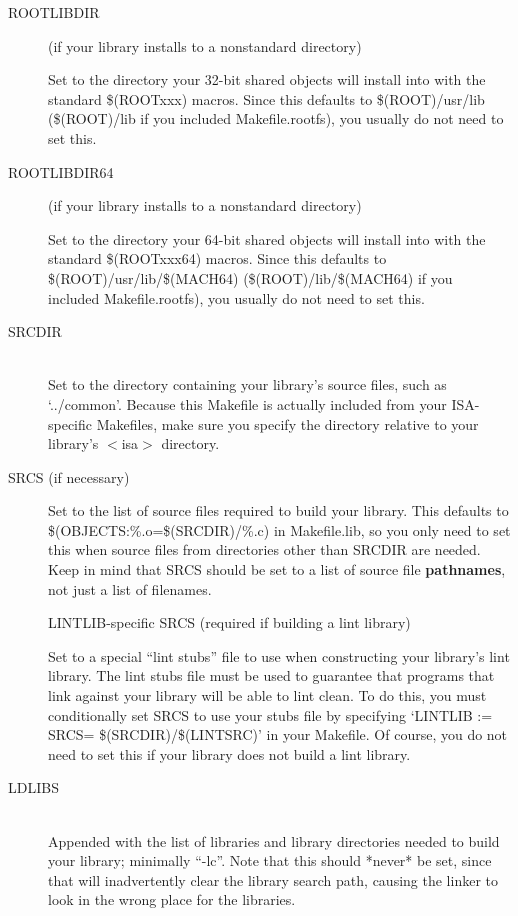 \documentclass{article}
\begin{document}
\begin{description}
\item[ROOTLIBDIR] (if your library installs to a nonstandard directory)

  Set to the directory your 32-bit shared objects will install into with the
  standard \$(ROOTxxx) macros. Since this defaults to \$(ROOT)/usr/lib
  (\$(ROOT)/lib if you included Makefile.rootfs), you usually do not need to set
  this.

\item[ROOTLIBDIR64] (if your library installs to a nonstandard directory)

  Set to the directory your 64-bit shared objects will install into with the
  standard \$(ROOTxxx64) macros. Since this defaults to \\
  \$(ROOT)/usr/lib/\$(MACH64) (\$(ROOT)/lib/\$(MACH64) if you \\ included
  Makefile.rootfs), you usually do not need to set this.

\item[SRCDIR] \hfill \\
  Set to the directory containing your library's source files, such as
  `../common'. Because this Makefile is actually included from your ISA-specific
  Makefiles, make sure you specify the directory relative to your library's
  $<$isa$>$ directory.

\item[SRCS (if necessary)] \hfill

  Set to the list of source files required to build your library. This defaults
  to \$(OBJECTS:\%.o=\$(SRCDIR)/\%.c) in Makefile.lib, so you only need to set this
  when source files from directories other than SRCDIR are needed. Keep in mind
  that SRCS should be set to a list of source file {\bf pathnames}, not just a
  list of filenames.

  LINTLIB-specific SRCS (required if building a lint library)

  Set to a special ``lint stubs'' file to use when constructing your library's
  lint library. The lint stubs file must be used to guarantee that programs that
  link against your library will be able to lint clean. To do this, you must
  conditionally set SRCS to use your stubs file by specifying `LINTLIB := SRCS=
  \$(SRCDIR)/\$(LINTSRC)' in your Makefile. Of course, you do not need to set this
  if your library does not build a lint library.

\item[LDLIBS] \hfill \\
  Appended with the list of libraries and library directories needed to build
  your library; minimally ``-lc''. Note that this should *never* be set, since
  that will inadvertently clear the library search path, causing the linker to
  look in the wrong place for the libraries.


\end{description}
\end{document}
